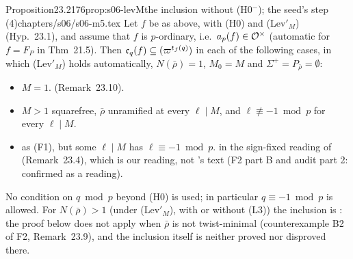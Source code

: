 \begin{quoted}{Proposition}{23.2}{176}{prop:s06-levM}{the inclusion without (H0$^-$); the seed's step (4)}{chapters/s06/s06-m5.tex}\label{rpt:prop:s06-levM}
Let $f$ be as above, with (H0) and (Lev$'_M$) (Hyp.~23.1), and assume that $f$ is $p$-ordinary, i.e.\ $a_p(f)\in\mathcal{O}^\times$
(automatic for $f=F_P$ in Thm~21.5). Then $\mathfrak{c}_q(f)\subseteq(\varpi^{t_f(q)})$ in each of the following cases, in which
(Lev$'_M$) holds automatically, $N(\bar\rho)=1$, $M_0=M$ and $\Sigma^+=P_{\bar\rho}=\emptyset$:
\begin{itemize}
\item[(F0)] $M=1$. \stpmc{} (Remark~23.10).
\item[(F1)] $M>1$ squarefree, $\bar\rho$ unramified at every $\ell\mid M$, and $\ell\not\equiv-1\bmod p$ for every $\ell\mid M$.
  \stpmc
\item[(F1$'$)] as (F1), but some $\ell\mid M$ has $\ell\equiv-1\bmod p$. \stpmc{} in the sign-fixed reading of \cite[Thm~3.14]{KO}
  (Remark~23.4), which is our reading, not \cite{KO}'s text (F2 part B and audit part 2: confirmed as a reading).

\end{itemize}
No condition on $q\bmod p$ beyond (H0) is used; in particular $q\equiv-1\bmod p$ is allowed. For $N(\bar\rho)>1$ (under (Lev$'_M$), with
or without (L3)) the inclusion is \stopen: the proof below does not apply when $\bar\rho$ is not twist-minimal (counterexample B2 of F2,
Remark~23.9), and the inclusion itself is neither proved nor disproved there.
\end{quoted}
